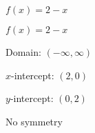 {$f(x) = 2-x$}
{$f(x) =2-x$

Domain: $(-\infty, \infty)$ 

$x$-intercept: $(2, 0)$ 

$y$-intercept: $\left(0, 2\right)$ 

No symmetry 

\begin{center}
\end{center}
}